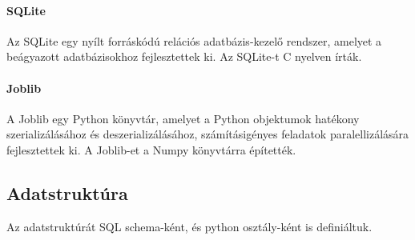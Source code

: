 \documentclass[12pt,a4paper]{article}
\begin{document}
\paragraph{SQLite} Az SQLite egy nyílt forráskódú relációs adatbázis-kezelő rendszer, amelyet a beágyazott adatbázisokhoz fejlesztettek ki. Az SQLite-t C nyelven írták.
\paragraph{Joblib} A Joblib egy Python könyvtár, amelyet a Python objektumok hatékony szerializálásához és deszerializálásához, számításigényes feladatok paralellizálására fejlesztettek ki. A Joblib-et a Numpy könyvtárra építették.

\newpage
\subsection{Adatstruktúra}
Az adatstruktúrát SQL schema-ként, és python osztály-ként is definiáltuk.
\end{document}
